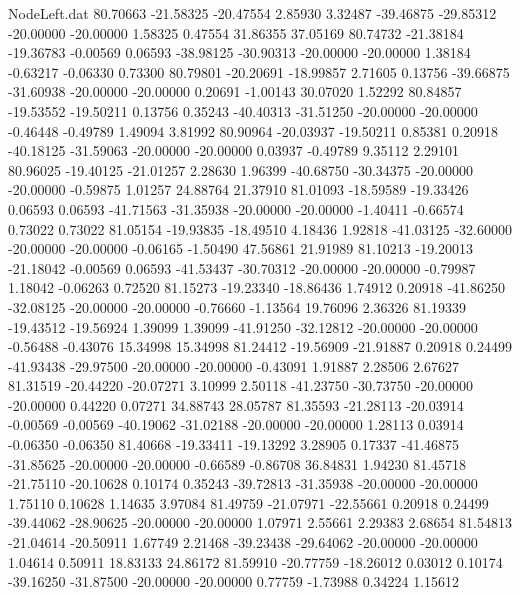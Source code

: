 \begin{filecontents}{NodeLeft.dat}
  80.70663  -21.58325  -20.47554     2.85930    3.32487  -39.46875  -29.85312  -20.00000  -20.00000    1.58325    0.47554   31.86355   37.05169
  80.74732  -21.38184  -19.36783    -0.00569    0.06593  -38.98125  -30.90313  -20.00000  -20.00000    1.38184   -0.63217   -0.06330    0.73300
  80.79801  -20.20691  -18.99857     2.71605    0.13756  -39.66875  -31.60938  -20.00000  -20.00000    0.20691   -1.00143   30.07020    1.52292
  80.84857  -19.53552  -19.50211     0.13756    0.35243  -40.40313  -31.51250  -20.00000  -20.00000   -0.46448   -0.49789    1.49094    3.81992
  80.90964  -20.03937  -19.50211     0.85381    0.20918  -40.18125  -31.59063  -20.00000  -20.00000    0.03937   -0.49789    9.35112    2.29101
  80.96025  -19.40125  -21.01257     2.28630    1.96399  -40.68750  -30.34375  -20.00000  -20.00000   -0.59875    1.01257   24.88764   21.37910
  81.01093  -18.59589  -19.33426     0.06593    0.06593  -41.71563  -31.35938  -20.00000  -20.00000   -1.40411   -0.66574    0.73022    0.73022
  81.05154  -19.93835  -18.49510     4.18436    1.92818  -41.03125  -32.60000  -20.00000  -20.00000   -0.06165   -1.50490   47.56861   21.91989
  81.10213  -19.20013  -21.18042    -0.00569    0.06593  -41.53437  -30.70312  -20.00000  -20.00000   -0.79987    1.18042   -0.06263    0.72520
  81.15273  -19.23340  -18.86436     1.74912    0.20918  -41.86250  -32.08125  -20.00000  -20.00000   -0.76660   -1.13564   19.76096    2.36326
  81.19339  -19.43512  -19.56924     1.39099    1.39099  -41.91250  -32.12812  -20.00000  -20.00000   -0.56488   -0.43076   15.34998   15.34998
  81.24412  -19.56909  -21.91887     0.20918    0.24499  -41.93438  -29.97500  -20.00000  -20.00000   -0.43091    1.91887    2.28506    2.67627
  81.31519  -20.44220  -20.07271     3.10999    2.50118  -41.23750  -30.73750  -20.00000  -20.00000    0.44220    0.07271   34.88743   28.05787
  81.35593  -21.28113  -20.03914    -0.00569   -0.00569  -40.19062  -31.02188  -20.00000  -20.00000    1.28113    0.03914   -0.06350   -0.06350
  81.40668  -19.33411  -19.13292     3.28905    0.17337  -41.46875  -31.85625  -20.00000  -20.00000   -0.66589   -0.86708   36.84831    1.94230
  81.45718  -21.75110  -20.10628     0.10174    0.35243  -39.72813  -31.35938  -20.00000  -20.00000    1.75110    0.10628    1.14635    3.97084
  81.49759  -21.07971  -22.55661     0.20918    0.24499  -39.44062  -28.90625  -20.00000  -20.00000    1.07971    2.55661    2.29383    2.68654
  81.54813  -21.04614  -20.50911     1.67749    2.21468  -39.23438  -29.64062  -20.00000  -20.00000    1.04614    0.50911   18.83133   24.86172
  81.59910  -20.77759  -18.26012     0.03012    0.10174  -39.16250  -31.87500  -20.00000  -20.00000    0.77759   -1.73988    0.34224    1.15612

\end{filecontents}
